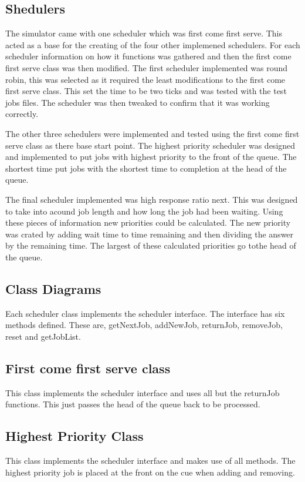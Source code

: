 \documentclass{acm_proc_article-sp}
\begin{document}
\subsection{Shedulers}
The simulator came with one scheduler which was first come first serve. This acted as a base for the creating of the four other implemened schedulers. For each scheduler information on how it functions was gathered and then the first come first serve class was then modified. The first scheduler implemented was round robin, this was selected as it required the least modifications to the first come first serve class. This set the time to be two ticks and was tested with the test jobs files. The scheduler was then tweaked to confirm that it was working correctly.

The other three schedulers were implemented and tested using the first come first serve class as there base start point. The highest priority scheduler was designed and implemented to put jobs with highest priority to the front of the queue. The shortest time put jobs with the shortest time to completion at the head of the queue.

The final scheduler implemented was high response ratio next. This was designed to take into acound job length and how long the job had been waiting. Using these pieces of information new priorities could be calculated. The new priority was crated by adding wait time to time remaining and then dividing the answer by the remaining time. The largest of these calculated priorities go tothe head of the queue. 

\subsection{Class Diagrams}
Each scheduler class implements the scheduler interface. The interface has six methods defined. These are, getNextJob, addNewJob, returnJob, removeJob, reset and getJobList.

\subsection{First come first serve class}
This class implements the scheduler interface and uses all but the returnJob functions. This just passes the head of the queue back to be processed.

\subsection{Highest Priority Class}
This class implements the scheduler interface and makes use of all methods. The highest priority job is placed at the front on the cue when adding and removing.
\end{document}
